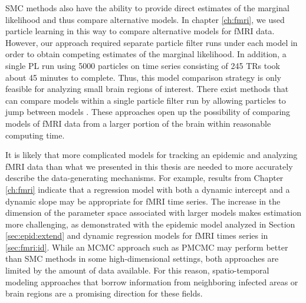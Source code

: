 SMC methods also have the ability to provide direct estimates of the marginal likelihood and thus compare alternative models. In chapter \ref{ch:fmri}, we used particle learning in this way to compare alternative models for fMRI data. However, our approach required separate particle filter runs under each model in order to obtain competing estimates of the marginal likelihood. In addition, a single PL run using 5000 particles on time series consisting of 245 TRs took about 45 minutes to complete. Thus, this model comparison strategy is only feasible for analyzing small brain regions of interest. There exist methods that can compare models within a single particle filter run by allowing particles to jump between models \citep{berz:gilks:rmcross:2001,zhou:joh:smcmodcomp:2013}. These approaches open up the possibility of comparing models of fMRI data from a larger portion of the brain within reasonable computing time.

It is likely that more complicated models for tracking an epidemic \citep{Sham:Kars:pnas:2012, Bhad:Ioni:mala:2011} and analyzing fMRI data \citep{buxton:balloon:1998} than what we presented in this thesis are needed to more accurately describe the data-generating mechanisms. For example, results from Chapter \ref{ch:fmri} indicate that a regression model with both a dynamic intercept and a dynamic slope may be appropriate for fMRI time series. The increase in the dimension of the parameter space associated with larger models makes estimation more challenging, as demonstrated with the epidemic model analyzed in Section \ref{sec:epid:extend} and dynamic regression models for fMRI times series in \ref{sec:fmri:id}. While an MCMC approach such as PMCMC may perform better than SMC methods in some high-dimensional settings, both approaches are limited by the amount of data available. For this reason, spatio-temporal modeling approaches that borrow information from neighboring infected areas or brain regions are a promising direction for these fields. 